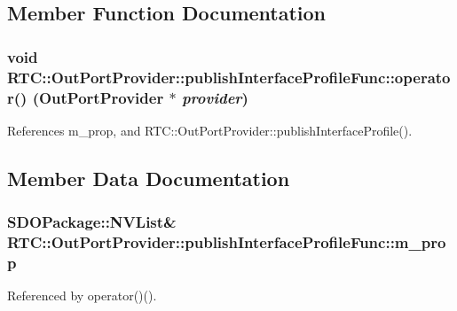 \subsection{Member Function Documentation}
\subsubsection[{operator()}]{\setlength{\rightskip}{0pt plus 5cm}void RTC::OutPortProvider::publishInterfaceProfileFunc::operator() ({\bf OutPortProvider} $\ast$ {\em provider})\hspace{0.3cm}{\ttfamily  [inline]}}\label{structRTC_1_1OutPortProvider_1_1publishInterfaceProfileFunc_a9b4daf4995cb55e53056ea10acb6ca1f}


References m\_\-prop, and RTC::OutPortProvider::publishInterfaceProfile().



\subsection{Member Data Documentation}
\subsubsection[{m\_\-prop}]{\setlength{\rightskip}{0pt plus 5cm}SDOPackage::NVList\& {\bf RTC::OutPortProvider::publishInterfaceProfileFunc::m\_\-prop}}\label{structRTC_1_1OutPortProvider_1_1publishInterfaceProfileFunc_a3fa041ada8af44b99d786bec2dd5439d}


Referenced by operator()().

